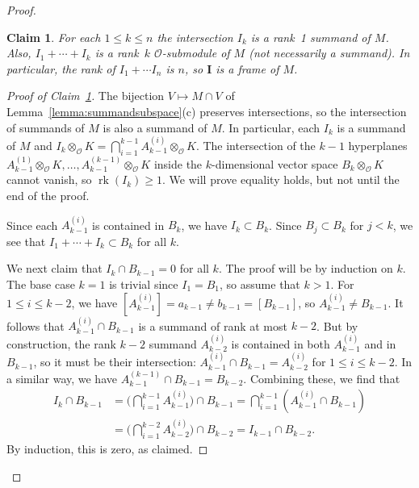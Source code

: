 \documentclass[11 pt]{article}
\theoremstyle{plain}
\newtheorem{claims}{Claim}
\newcommand\BeginClaims{\setcounter{claims}{0}}
\theoremstyle{definition}
\numberwithin{equation}{section}
\renewcommand{\O}{\mathcal{O}}
\newcommand\II{\mathbf{I}}
\newcommand\tensor{\otimes}
\DeclareMathOperator{\Rank}{rk}
\begin{document}
\begin{proof}
\BeginClaims
\begin{claims}
\label{claim:frame}
For each $1\leq k\leq n$ the intersection $I_k$ is a rank~1 summand of $M$.  Also, $I_1 + \cdots + I_k$ is a rank~$k$ $\O$-submodule
of $M$ (not necessarily a summand).  In particular, the rank of $I_1 + \cdots I_n$ is $n$, so
$\II$ is a frame of $M$.
\end{claims}
\begin{proof}[Proof of Claim~\ref{claim:frame}]
The bijection $V\mapsto M\cap V$ of Lemma~\ref{lemma:summandsubspace}(c) preserves intersections, so 
the intersection of summands of $M$ is also a summand of $M$.  In particular, each $I_k$ is a summand of $M$ 
and $I_k\tensor_\O K=\bigcap_{i=1}^{k-1} A_{k-1}^{(i)} \tensor_\O K$.  The intersection of the $k-1$ 
hyperplanes $A_{k-1}^{(1)} \tensor_\O K, \ldots, A_{k-1}^{(k-1)} \tensor_{\O} K$ 
inside the $k$-dimensional vector space $B_k\tensor_\O K$ cannot vanish, so $\Rank(I_k) \geq 1$. We will prove equality holds, but not until the end of the proof.

Since each $A_{k-1}^{(i)}$ is contained in $B_k$, we have $I_k\subset B_k$.  Since $B_j\subset B_k$ for $j<k$, 
we see that $I_1+\cdots+I_k \subset B_k$ for all $k$.

We next claim that $I_k\cap B_{k-1}=0$ for all $k$.   The proof will be by induction on $k$.  The base case
$k=1$ is trivial since $I_1=B_1$, so assume that $k > 1$.  For $1 \leq i \leq k-2$, we have
$[A_{k-1}^{(i)}] = a_{k-1} \neq b_{k-1} = [B_{k-1}]$, so $A_{k-1}^{(i)}\neq B_{k-1}$. 
It follows that $A_{k-1}^{(i)}\cap B_{k-1}$ is a summand of rank at most $k-2$.  But by construction, the rank $k-2$ summand
$A_{k-2}^{(i)}$ is contained in both $A_{k-1}^{(i)}$ and in $B_{k-1}$, so it must be their intersection: 
$A_{k-1}^{(i)} \cap B_{k-1}=A_{k-2}^{(i)}$ for $1 \leq i \leq k-2$.  
In a similar way, we have $A_{k-1}^{(k-1)} \cap B_{k-1} = B_{k-2}$. Combining these, we find that
\begin{align*}
I_{k} \cap B_{k-1}&=\big(\bigcap_{i=1}^{k-1} A_{k-1}^{(i)}\big)\cap B_{k-1}=\bigcap_{i=1}^{k-1}(A_{k-1}^{(i)}\cap B_{k-1})\\
&=\big(\bigcap_{i=1}^{k-2}A_{k-2}^{(i)}\big)\cap B_{k-2}=I_{k-1}\cap B_{k-2}.
\end{align*}
By induction, this is zero, as claimed.


\end{proof}
\end{proof}
\end{document}
